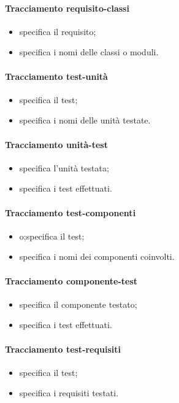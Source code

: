 \paragraph{Tracciamento requisito-classi}
\begin{itemize}
\item {}specifica il requisito;
\item {}specifica i nomi delle classi o moduli.
\end{itemize}

\paragraph{Tracciamento test-unità}
\begin{itemize}
\item {}specifica il test;
\item {}specifica i nomi delle unità testate.
\end{itemize}
\paragraph{Tracciamento unità-test}
\begin{itemize}
\item {}specifica l'unità testata;
\item {}specifica i test effettuati.
\end{itemize}
\paragraph{Tracciamento test-componenti}
\begin{itemize}
\item {}o;specifica il test;
\item {}specifica i nomi dei componenti coinvolti.
\end{itemize}
\paragraph{Tracciamento componente-test}
\begin{itemize}
\item {}specifica il componente testato;
\item {}specifica i test effettuati.
\end{itemize}
\paragraph{Tracciamento test-requisiti}
\begin{itemize}
\item {}specifica il test;
\item {}specifica i requisiti testati.
\end{itemize}
